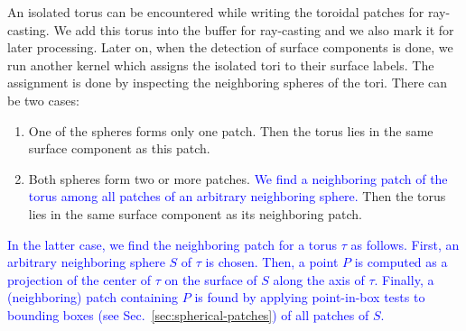 An isolated torus can be encountered while writing the toroidal patches for ray-casting.
We add this torus into the buffer for ray-casting and we also mark it for later processing.
Later on, when the detection of surface components is done, we run another kernel which assigns the isolated tori to their surface labels.
The assignment is done by inspecting the neighboring spheres of the tori.
There can be two cases:
\begin{enumerate}
  \item One of the spheres forms only one patch. Then the torus lies in the same surface component as this patch.
	\item Both spheres form two or more patches.
	\textcolor{blue}{We find a neighboring patch of the torus among all patches of an arbitrary neighboring sphere.}
	Then the torus lies in the same surface component as its neighboring patch.
\end{enumerate}

\textcolor{blue}{In the latter case, we find the neighboring patch for a torus $\tau$ as follows.
First, an arbitrary neighboring sphere $S$ of $\tau$ is chosen.
Then, a point $P$ is computed as a projection of the center of $\tau$ on the surface of $S$ along the axis of $\tau$.
Finally, a (neighboring) patch containing $P$ is found by applying point-in-box tests to bounding boxes (see Sec.~\ref{sec:spherical-patches}) of all patches of $S$.} 

